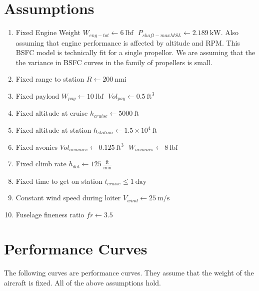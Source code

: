 \documentclass[10pt, a4paper]{article}
\begin{document}
\title{}
\author{Michael Burton}
\maketitle

\section*{Assumptions}

\begin{enumerate}
\item Fixed Engine Weight $ W_{eng-tot} \gets 6~\mathrm{lbf} \text{ } P_{shaft-maxMSL} \gets 2.189~\mathrm{kW} $.  Also assuming that engine performance is affected by altitude and RPM. This BSFC model is technically fit for a single propellor.  We are assuming that the the variance in BSFC curves in the family of propellers is small.  
\item Fixed range to station $ R \gets 200~\mathrm{nmi} $
\item Fixed payload $ W_{pay} \gets 10~\mathrm{lbf} \text{ } Vol_{pay} \gets 0.5~\mathrm{ft^{3}} $
\item Fixed altitude at cruise $ h_{cruise} \gets 5000~\mathrm{ft} $
\item Fixed altitude at station $ h_{station} \gets 1.5 \times 10^{4}~\mathrm{ft} $
\item Fixed avonics $ Vol_{avionics} \gets 0.125~\mathrm{ft^{3}} \text{ } W_{avionics} \gets 8~\mathrm{lbf} $
\item Fixed climb rate $ h_{dot} \gets 125~\mathrm{\tfrac{ft}{min}} $
\item Fixed time to get on station  $ t_{cruise} \leq 1~\mathrm{day} $
\item Constant wind speed during loiter $ V_{wind} \gets 25~\mathrm{m/s} $
\item Fuselage fineness ratio $ fr \gets 3.5 $
\end{enumerate}
\newpage

\section*{Performance Curves}

The following curves are performance curves.  They assume that the weight of the aircraft is fixed. All of the above assumptions hold.  
\end{document}
